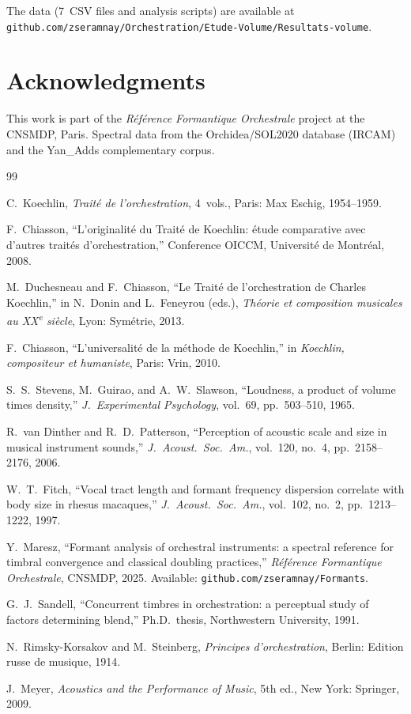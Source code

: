 \documentclass[journal]{IEEEtran}
\begin{document}
The data (7~CSV files and analysis scripts) are available at \texttt{github.com/zseramnay/Orchestration/Etude-Volume/Resultats-volume}.

\section*{Acknowledgments}
This work is part of the \textit{Référence Formantique Orchestrale} project at the CNSMDP, Paris. Spectral data from the Orchidea/SOL2020 database (IRCAM) and the Yan\_Adds complementary corpus.

\begin{thebibliography}{99}

C.~Koechlin, \textit{Traité de l'orchestration}, 4~vols., Paris: Max Eschig, 1954--1959.

F.~Chiasson, ``L'originalité du Traité de Koechlin: étude comparative avec d'autres traités d'orchestration,'' Conference OICCM, Université de Montréal, 2008.

M.~Duchesneau and F.~Chiasson, ``Le Traité de l'orchestration de Charles Koechlin,'' in N.~Donin and L.~Feneyrou (eds.), \textit{Théorie et composition musicales au XX\textsuperscript{e} siècle}, Lyon: Symétrie, 2013.

F.~Chiasson, ``L'universalité de la méthode de Koechlin,'' in \textit{Koechlin, compositeur et humaniste}, Paris: Vrin, 2010.

S.~S.~Stevens, M.~Guirao, and A.~W.~Slawson, ``Loudness, a product of volume times density,'' \textit{J.~Experimental Psychology}, vol.~69, pp.~503--510, 1965.

R.~van Dinther and R.~D.~Patterson, ``Perception of acoustic scale and size in musical instrument sounds,'' \textit{J.~Acoust.~Soc.~Am.}, vol.~120, no.~4, pp.~2158--2176, 2006.

W.~T.~Fitch, ``Vocal tract length and formant frequency dispersion correlate with body size in rhesus macaques,'' \textit{J.~Acoust.~Soc.~Am.}, vol.~102, no.~2, pp.~1213--1222, 1997.

Y.~Maresz, ``Formant analysis of orchestral instruments: a spectral reference for timbral convergence and classical doubling practices,'' \textit{Référence Formantique Orchestrale}, CNSMDP, 2025. Available: \texttt{github.com/zseramnay/Formants}.

G.~J.~Sandell, ``Concurrent timbres in orchestration: a perceptual study of factors determining blend,'' Ph.D.\ thesis, Northwestern University, 1991.

N.~Rimsky-Korsakov and M.~Steinberg, \textit{Principes d'orchestration}, Berlin: Edition russe de musique, 1914.

J.~Meyer, \textit{Acoustics and the Performance of Music}, 5th ed., New York: Springer, 2009.

\end{thebibliography}
\end{document}
